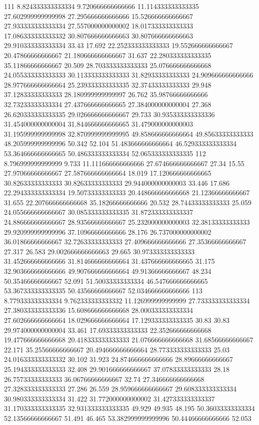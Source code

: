 111 8.824333333333334 9.720666666666666 11.114333333333335 27.602999999999998 27.295666666666666 15.526666666666667 27.933333333333334 27.557000000000002 18.017333333333333 17.086333333333332 30.807666666666663 30.807666666666663 29.910333333333334 33.43 17.692 22.252333333333333 19.552666666666667 20.47866666666667 21.180666666666667 31.637 22.280333333333335 35.11866666666667 20.509 28.703333333333333 25.076666666666668 24.055333333333333 30.113333333333333 31.82933333333333 24.909666666666666 28.977666666666664 25.239333333333335 32.37433333333333 29.948 37.12833333333333 28.180999999999997 26.762 35.98766666666666 32.73233333333334 27.437666666666665 27.384000000000004 27.368 26.620333333333335 29.026666666666667 29.733 30.935333333333336 31.454000000000004 31.844666666666665 31.479000000000003 31.195999999999998 32.870999999999995 49.858666666666664 49.85633333333333 48.205999999999996 50.342 52.104 51.483666666666664 46.529333333333334 53.364666666666665 50.486333333333334 52.065333333333335
112 8.796999999999999 9.733 11.111666666666666 27.674666666666667 27.34 15.55 27.97066666666667 27.587666666666664 18.019 17.120666666666665 30.82633333333333 30.82633333333333 29.944000000000003 33.446 17.686 22.294333333333334 19.50733333333333 20.448666666666668 21.12366666666667 31.655 22.207666666666668 35.18266666666666 20.532 28.74433333333333 25.059 24.055666666666667 30.085333333333335 31.872333333333337 24.886666666666667 28.93566666666667 25.232000000000003 32.38133333333333 29.920999999999996 37.10966666666666 28.176 26.737000000000002 36.01866666666667 32.72633333333333 27.409666666666666 27.35366666666667 27.317 26.583 29.002666666666663 29.665 30.973333333333333 31.452666666666666 31.814666666666664 31.437666666666665 31.175 32.903666666666666 49.907666666666664 49.91366666666667 48.234 50.35466666666667 52.091 51.50033333333334 46.547666666666665 53.367333333333335 50.43566666666667 52.034666666666666
113 8.779333333333334 9.762333333333332 11.126999999999999 27.733333333333334 27.380333333333336 15.608666666666668 28.000333333333334 27.602666666666664 18.029666666666664 17.129333333333335 30.83 30.83 29.974000000000004 33.461 17.69333333333333 22.352666666666668 19.477666666666668 20.418333333333333 21.076666666666668 31.68566666666667 22.171 35.25566666666667 20.494666666666664 28.773333333333333 25.03 24.016333333333332 30.102 31.923 24.874666666666666 28.89666666666667 25.194333333333333 32.408 29.901666666666667 37.07833333333333 28.18 26.75733333333333 36.06766666666667 32.74 27.346666666666668 27.328333333333333 27.286 26.559 28.959666666666667 29.608333333333334 30.980333333333334 31.422 31.772000000000002 31.427333333333337 31.170333333333335 32.931333333333335 49.929 49.935 48.195 50.36033333333334 52.13566666666667 51.491 46.465 53.382999999999996 50.44466666666666 52.053
